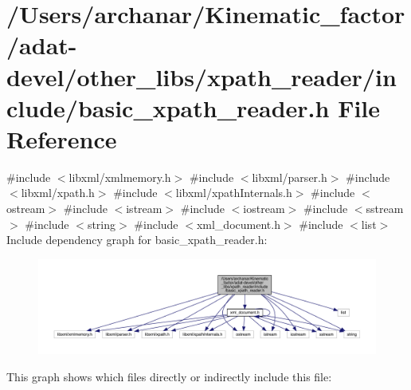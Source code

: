\hypertarget{adat-devel_2other__libs_2xpath__reader_2include_2basic__xpath__reader_8h}{}\section{/\+Users/archanar/\+Kinematic\+\_\+factor/adat-\/devel/other\+\_\+libs/xpath\+\_\+reader/include/basic\+\_\+xpath\+\_\+reader.h File Reference}
\label{adat-devel_2other__libs_2xpath__reader_2include_2basic__xpath__reader_8h}
{\ttfamily \#include $<$libxml/xmlmemory.\+h$>$}\newline
{\ttfamily \#include $<$libxml/parser.\+h$>$}\newline
{\ttfamily \#include $<$libxml/xpath.\+h$>$}\newline
{\ttfamily \#include $<$libxml/xpath\+Internals.\+h$>$}\newline
{\ttfamily \#include $<$ostream$>$}\newline
{\ttfamily \#include $<$istream$>$}\newline
{\ttfamily \#include $<$iostream$>$}\newline
{\ttfamily \#include $<$sstream$>$}\newline
{\ttfamily \#include $<$string$>$}\newline
{\ttfamily \#include $<$xml\+\_\+document.\+h$>$}\newline
{\ttfamily \#include $<$list$>$}\newline
Include dependency graph for basic\+\_\+xpath\+\_\+reader.\+h\+:
\nopagebreak
\begin{figure}[H]
\begin{center}
\leavevmode
\includegraphics[width=350pt]{d7/db0/adat-devel_2other__libs_2xpath__reader_2include_2basic__xpath__reader_8h__incl}
\end{center}
\end{figure}
This graph shows which files directly or indirectly include this file\+:
\nopagebreak
